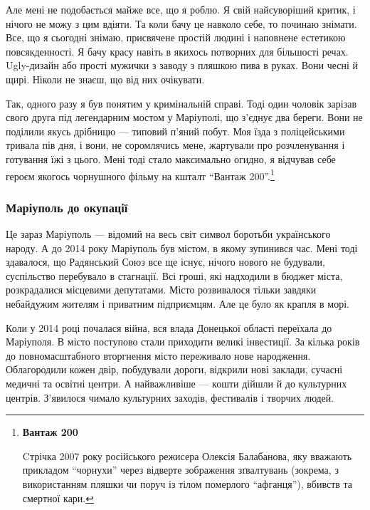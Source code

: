 
Але мені не подобається майже все, що я роблю. Я свій найсуворіший критик, і
нічого не можу з цим вдіяти. Та коли бачу це навколо себе, то починаю знімати.
Все, що я сьогодні знімаю, присвячене простій людині і наповнене естетикою
повсякденності. Я бачу красу навіть в якихось потворних для більшості речах.
Ugly-дизайн або прості мужички з заводу з пляшкою пива в руках. Вони чесні й
щирі. Ніколи не знаєш, що від них очікувати.

Так, одного разу я був понятим у кримінальній справі. Тоді один чоловік зарізав
свого друга під легендарним мостом у Маріуполі, що з'єднує два береги. Вони не
поділили якусь дрібницю — типовий п'яний побут. Моя їзда з поліцейськими
тривала пів дня, і вони, не соромлячись мене, жартували про розчленування і
готування їжі з цього. Мені тоді стало максимально огидно, я відчував себе
героєм якогось чорнушного фільму на кшталт \enquote{Вантаж 200}.\footnote{
\textbf{Вантаж 200}\par Cтрічка 2007 року російського режисера Олексія
Балабанова, яку вважають прикладом \enquote{чорнухи} через відверте зображення
зґвалтувань (зокрема, з використанням пляшки чи поруч із тілом померлого
\enquote{афганця}), вбивств та смертної кари.}


\subsubsection{Маріуполь до окупації}

Це зараз Маріуполь — відомий на весь світ символ боротьби українського народу.
А до 2014 року Маріуполь був містом, в якому зупинився час. Мені тоді
здавалося, що Радянський Союз все ще існує, нічого нового не будували,
суспільство перебувало в стагнації. Всі гроші, які надходили в бюджет міста,
розкрадалися місцевими депутатами. Місто розвивалося тільки завдяки небайдужим
жителям і приватним підприємцям. Але це було як крапля в морі.


Коли у 2014 році почалася війна, вся влада Донецької області переїхала до
Маріуполя. В місто поступово стали приходити великі інвестиції. За кілька років
до повномасштабного вторгнення місто переживало нове народження. Облагородили
кожен двір, побудували дороги, відкрили нові заклади, сучасні медичні та
освітні центри. А найважливіше — кошти дійшли й до культурних центрів.
З'явилося чимало культурних заходів, фестивалів і творчих людей.

